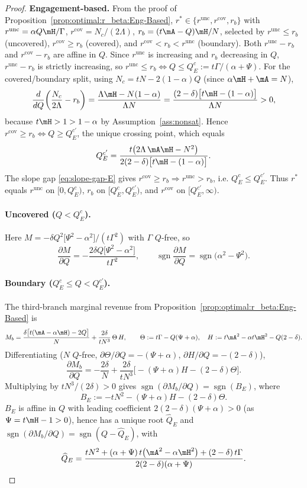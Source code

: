 \begin{proof}
\textbf{Engagement-based.}
From the proof of Proposition~\ref{prop:optimal:r_beta:Eng-Based},
$r^{*}\in\{r^{\mathrm{unc}},r^{\mathrm{cov}},r_b\}$ with
$r^{\mathrm{unc}}=\alpha Q\mH/\Gamma$, $r^{\mathrm{cov}}=N_c/(2\Lambda)$,
$r_b=(t\mA-Q)\mH/N$, selected by $r^{\mathrm{unc}}\le r_b$ (uncovered),
$r^{\mathrm{cov}}\ge r_b$ (covered), and $ r^{\mathrm{cov}}<r_b<r^{\mathrm{unc}}$
(boundary). Both $r^{\mathrm{unc}}-r_b$ and $r^{\mathrm{cov}}-r_b$ are affine in $Q$.
Since $r^{\mathrm{unc}}$ is increasing and $r_b$ decreasing in $Q$,
$r^{\mathrm{unc}}-r_b$ is strictly increasing, so
$r^{\mathrm{unc}}\le r_b\iff Q\le Q^{c}_{E}:=t\Gamma/(\alpha+\Psi)$. For the
covered/boundary split, using $N_c=tN-2(1-\alpha)Q$ (since $\alpha\mH+\mA=N$),
\[
\frac{d}{dQ}\!\left(\frac{N_c}{2\Lambda}-r_b\right)
=\frac{\Lambda\mH-N(1-\alpha)}{\Lambda N}
=\frac{(2-\delta)\bigl[t\mH-(1-\alpha)\bigr]}{\Lambda N}>0,
\]
because $t\mH>1>1-\alpha$ by Assumption~\ref{ass:nonsat}. Hence
$r^{\mathrm{cov}}\ge r_b\iff Q\ge Q^{c'}_{E}$, the unique crossing point, which equals
\[
Q^{c'}_{E}=\frac{t\bigl(2\Lambda\,\mA\mH-N^{2}\bigr)}{2(2-\delta)\bigl[t\mH-(1-\alpha)\bigr]} .
\]
The slope gap \eqref{eq:slope-gap-E} gives $r^{\mathrm{cov}}\ge r_b\Rightarrow
r^{\mathrm{unc}}>r_b$, i.e. $Q^{c}_{E}\le Q^{c'}_{E}$. Thus $r^{*}$ equals
$r^{\mathrm{unc}}$ on $[0,Q^{c}_{E})$, $r_b$ on $[Q^{c}_{E},Q^{c'}_{E})$, and
$r^{\mathrm{cov}}$ on $[Q^{c'}_{E},\infty)$.

\paragraph{Uncovered ($Q<Q^{c}_{E}$).}
Here $M=-\delta Q^{2}\bigl[\Psi^{2}-\alpha^{2}\bigr]/(t\Gamma^{2})$ with $\Gamma$ $Q$-free, so
\[
\frac{\partial M}{\partial Q}=-\frac{2\delta Q\bigl[\Psi^{2}-\alpha^{2}\bigr]}{t\Gamma^{2}},
\qquad
\operatorname{sgn}\frac{\partial M}{\partial Q}=\operatorname{sgn}\!\bigl(\alpha^{2}-\Psi^{2}\bigr).
\]

\paragraph{Boundary ($Q^{c}_{E}\le Q<Q^{c'}_{E}$).}
The third-branch marginal revenue from
Proposition~\ref{prop:optimal:r_beta:Eng-Based} is
\[
M_b=\frac{\delta\bigl[t(\mA-\alpha\mH)-2Q\bigr]}{N}
+\frac{2\delta}{tN^{3}}\,\Theta\,H,
\qquad
\Theta:=t\Gamma-Q(\Psi+\alpha),\quad H:=t\mA^{2}-\alpha t\mH^{2}-Q(2-\delta).
\]
Differentiating ($N$ $Q$-free, $\partial\Theta/\partial Q=-(\Psi+\alpha)$,
$\partial H/\partial Q=-(2-\delta)$),
\[
\frac{\partial M_b}{\partial Q}
=-\frac{2\delta}{N}+\frac{2\delta}{tN^{3}}\bigl[-(\Psi+\alpha)H-(2-\delta)\Theta\bigr].
\]
Multiplying by $tN^{3}/(2\delta)>0$ gives
$\operatorname{sgn}(\partial M_b/\partial Q)=\operatorname{sgn}(B_E)$, where
\[
B_E:=-tN^{2}-(\Psi+\alpha)H-(2-\delta)\Theta .
\]
$B_E$ is affine in $Q$ with leading coefficient $2(2-\delta)(\Psi+\alpha)>0$
(as $\Psi=t\mH-1>0$), hence has a unique root $\widehat Q_{E}$ and
$\operatorname{sgn}(\partial M_b/\partial Q)=\operatorname{sgn}(Q-\widehat Q_{E})$, with
\[
\widehat Q_{E}=\frac{tN^{2}+(\alpha+\Psi)\,t\bigl(\mA^{2}-\alpha\mH^{2}\bigr)+(2-\delta)\,t\Gamma}
{2(2-\delta)(\alpha+\Psi)} .
\]


\end{proof}
